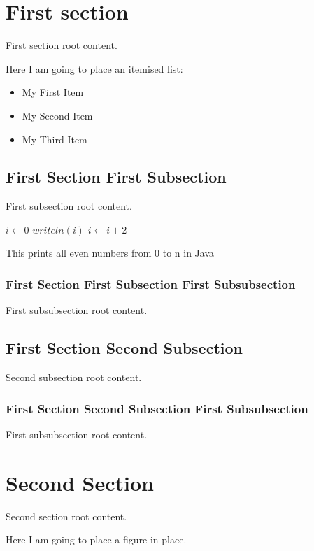 \documentclass[12pt,twocolumn,a4paper,twoside]{article}
\begin{document}
\section{First section}
First section root content.

Here I am going to place an itemised list:

\begin{itemize}
\item My First Item
\item My Second Item
\item My Third Item
\end{itemize}

\subsection{First Section First Subsection}
First subsection root content.


\begin{algorithm}
    \begin{algorithmic}
        \STATE $i\gets 0$
            \STATE $writeln(i)$
            \STATE $i\gets i+2$
        \ENDWHILE
    \end{algorithmic}
    \caption{This prints all even numbers from 0 to n in Java}
    \label{loopAlgorithm}
\end{algorithm}

\subsubsection{First Section First Subsection First Subsubsection}
First subsubsection root content.
\subsection{First Section Second Subsection}
Second subsection root content.
\subsubsection{First Section Second Subsection First Subsubsection}
First subsubsection root content.
\section{Second Section}
Second section root content.


Here I am going to place a figure in place.
\end{document}

